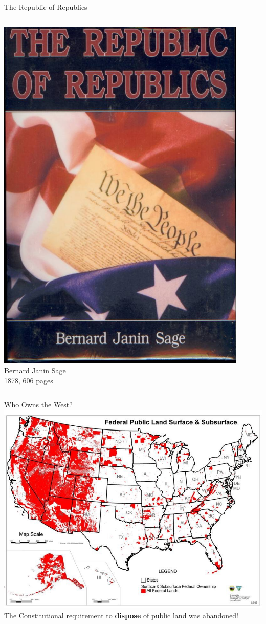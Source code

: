 \begin{frame}{The Republic of Republics}
    \begin{columns}[c]
            \centering
            \includegraphics[width=0.9\textwidth]{img/republic-of-republics.png} \\
        \column{0.5\textheight}
            \centering
            Bernard Janin Sage \\
            1878, 606 pages \\
    \end{columns}
\end{frame}

\begin{frame}{Who Owns the West?}
    \centering
    \includegraphics[width=.7\textwidth]{img/federal-lands.png} \\
    \pause
    \Large{The Constitutional requirement to \textbf{dispose} of public land was abandoned!} \\
\end{frame}

